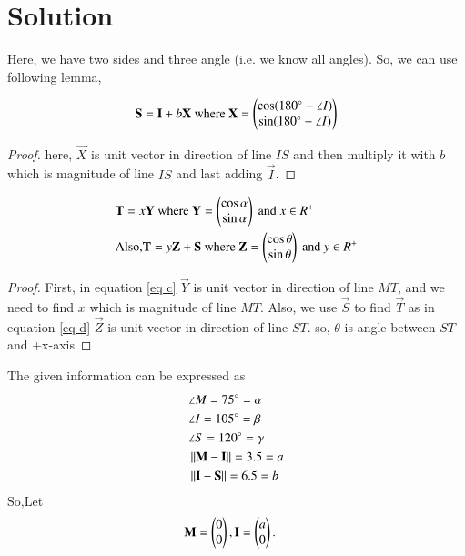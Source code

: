 \documentclass[journal,12pt,twocolumn]{IEEEtran}
\begin{document}
\section{Solution}
Here, we have two sides and three angle (i.e. we know all angles). So, we can use following lemma,
\begin{lemma}
\label{lemma a}
\begin{align}
\mathbf{S} =\mathbf{I} + b\mathbf{X} \text{ where } \mathbf{X} = \begin{pmatrix}\cos (180\degree -\angle I)\\\sin (180\degree -\angle I)\end{pmatrix} \label{eq b}
\end{align}
\begin{proof}
here, $\vec{X}$ is unit vector in direction of line $IS$ and then multiply it with $b$ which is magnitude of line $IS$ and last adding $\vec{I}$.
\end{proof}
\begin{align}
&\mathbf{T} = x\mathbf{Y} \text{ where } \mathbf{Y} = \begin{pmatrix}\cos\alpha\\\sin \alpha\end{pmatrix}\text{ and } x \in R^{+} \label{eq c}\\
&\text{Also,} \mathbf{T} = y\mathbf{Z}+\mathbf{S} \text{ where } \mathbf{Z} =  \begin{pmatrix}\cos\theta\\\sin\theta\end{pmatrix} \text{ and }y \in R^{+} \label{eq d}
\end{align}
\end{lemma}
\begin{proof}
First, in equation \eqref{eq c} $\vec{Y}$ is unit vector in direction of line $MT$, and we need to find $x$ which is magnitude of line $MT$. Also, we use $\vec{S}$ to find $\vec{T}$ as in equation \eqref{eq d} $\vec{Z}$ is unit vector in direction of line $ST$. so, $\theta$ is angle between $ST$ and +x-axis
\end{proof}
The given information can be expressed as
\begin{align}
    &\angle M = 75\degree = \alpha \label{eq 1}
    \\
    &\angle I = 105\degree = \beta \label{eq 2}
    \\
    &\angle S = 120\degree = \gamma \label{eq 3}
    \\
    &\left\lVert\mathbf{M}-\mathbf{I}\right\rVert = 3.5 = a \label{eq 4}
    \\
    &\left\lVert\mathbf{I}-\mathbf{S}\right\rVert = 6.5 = b \label{eq 5}
\end{align}
So,Let  
\begin{align}
&\mathbf{M}=\begin{pmatrix}0\\0\end{pmatrix},\mathbf{I}=\begin{pmatrix}a\\0\end{pmatrix}.
\end{align}
\end{document}
